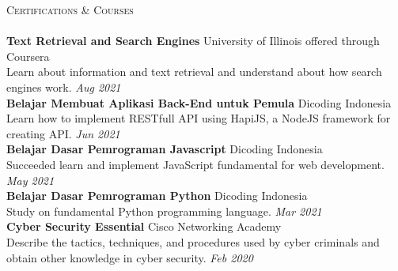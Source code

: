 \documentclass[a4paper]{article}
\newcommand{\lineunder} {
    \vspace*{-8pt} \\
    \hspace*{-18pt} \hrulefill \\
}
\newcommand{\header} [1] {
    {\hspace*{-18pt}\vspace*{6pt} \textsc{#1}}
    \vspace*{-6pt} \lineunder
}
\begin{document}
\header{Certifications \& Courses}
\textbf{Text Retrieval and Search Engines} \hfill University of Illinois offered through Coursera\\
Learn about information and text retrieval and understand about how search engines work. \hfill \textit{Aug 2021}\\
\vspace*{2mm}
\textbf{Belajar Membuat Aplikasi Back-End untuk Pemula} \hfill Dicoding Indonesia\\
Learn how to implement RESTfull API using HapiJS, a NodeJS framework for creating API. \hfill \textit{Jun 2021}\\
\vspace*{2mm}
\textbf{Belajar Dasar Pemrograman Javascript} \hfill Dicoding Indonesia\\
Succeeded learn and implement JavaScript fundamental for web development. \hfill \textit{May 2021}\\
\vspace*{2mm}
\textbf{Belajar Dasar Pemrograman Python} \hfill Dicoding Indonesia\\
Study on fundamental Python programming language. \hfill \textit{Mar 2021}\\
\vspace*{2mm}
\textbf{Cyber Security Essential} \hfill Cisco Networking Academy\\
Describe the tactics, techniques, and procedures used by cyber criminals and obtain other knowledge in cyber security. \hfill \textit{Feb 2020}\\
\vspace*{2mm}

\ 
\end{document}
